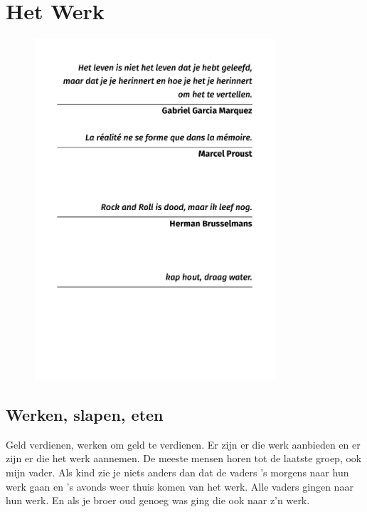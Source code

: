 \documentclass[12pt,twoside, openright]{memoir}
\begin{document}
\chapter{Het Werk}

\thispagestyle{empty}
\begin{flushright}
\begin{figure}
\includegraphics[width=0.8\textwidth, right]{img/epi/epi2}
\end{figure}
\end{flushright}

\section*{Werken, slapen, eten} %
\label{cha:werkenslapen}

Geld verdienen, werken om geld te verdienen. Er zijn er die werk aanbieden en er zijn er die het werk aannemen. De meeste mensen horen tot de laatste groep, ook mijn vader. Als kind zie je niets anders dan dat de vaders ’s morgens naar hun werk gaan en ’s avonds weer thuis komen van het werk. Alle vaders gingen naar hun werk. En als je broer oud genoeg was ging die ook naar z’n werk.
\end{document}
